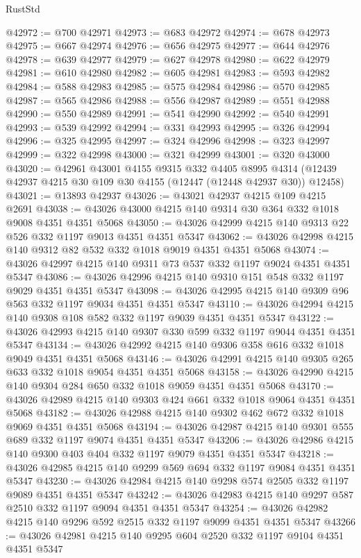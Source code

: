 \begin{lexlean}{RustStd}
\begin{coremodule}
@42972 := @700 @42971
@42973 := @683 @42972
@42974 := @678 @42973
@42975 := @667 @42974
@42976 := @656 @42975
@42977 := @644 @42976
@42978 := @639 @42977
@42979 := @627 @42978
@42980 := @622 @42979
@42981 := @610 @42980
@42982 := @605 @42981
@42983 := @593 @42982
@42984 := @588 @42983
@42985 := @575 @42984
@42986 := @570 @42985
@42987 := @565 @42986
@42988 := @556 @42987
@42989 := @551 @42988
@42990 := @550 @42989
@42991 := @541 @42990
@42992 := @540 @42991
@42993 := @539 @42992
@42994 := @331 @42993
@42995 := @326 @42994
@42996 := @325 @42995
@42997 := @324 @42996
@42998 := @323 @42997
@42999 := @322 @42998
@43000 := @321 @42999
@43001 := @320 @43000
@43020 := @42961
    @43001
    @4155
    @9315
    @332
    @4405
    @8995
    @4314
    (@12439 @42937 @4215 @30 @109 @30 @4155 (@12447 (@12448 @42937 @30)) @12458)
@43021 := @13893 @42937
@43026 := @43021 @42937 @4215 @109 @4215 @2691
@43038 := @43026 @43000 @4215 @140 @9314 @30 @364 @332 @1018 @9008 @4351 @4351 @5068
@43050 := @43026 @42999 @4215 @140 @9313 @22 @526 @332 @1197 @9013 @4351 @4351 @5347
@43062 := @43026 @42998 @4215 @140 @9312 @82 @532 @332 @1018 @9019 @4351 @4351 @5068
@43074 := @43026 @42997 @4215 @140 @9311 @73 @537 @332 @1197 @9024 @4351 @4351 @5347
@43086 := @43026 @42996 @4215 @140 @9310 @151 @548 @332 @1197 @9029 @4351 @4351 @5347
@43098 := @43026 @42995 @4215 @140 @9309 @96 @563 @332 @1197 @9034 @4351 @4351 @5347
@43110 := @43026 @42994 @4215 @140 @9308 @108 @582 @332 @1197 @9039 @4351 @4351 @5347
@43122 := @43026 @42993 @4215 @140 @9307 @330 @599 @332 @1197 @9044 @4351 @4351 @5347
@43134 := @43026 @42992 @4215 @140 @9306 @358 @616 @332 @1018 @9049 @4351 @4351 @5068
@43146 := @43026 @42991 @4215 @140 @9305 @265 @633 @332 @1018 @9054 @4351 @4351 @5068
@43158 := @43026 @42990 @4215 @140 @9304 @284 @650 @332 @1018 @9059 @4351 @4351 @5068
@43170 := @43026 @42989 @4215 @140 @9303 @424 @661 @332 @1018 @9064 @4351 @4351 @5068
@43182 := @43026 @42988 @4215 @140 @9302 @462 @672 @332 @1018 @9069 @4351 @4351 @5068
@43194 := @43026 @42987 @4215 @140 @9301 @555 @689 @332 @1197 @9074 @4351 @4351 @5347
@43206 := @43026 @42986 @4215 @140 @9300 @403 @404 @332 @1197 @9079 @4351 @4351 @5347
@43218 := @43026 @42985 @4215 @140 @9299 @569 @694 @332 @1197 @9084 @4351 @4351 @5347
@43230 := @43026 @42984 @4215 @140 @9298 @574 @2505 @332 @1197 @9089 @4351 @4351 @5347
@43242 := @43026 @42983 @4215 @140 @9297 @587 @2510 @332 @1197 @9094 @4351 @4351 @5347
@43254 := @43026 @42982 @4215 @140 @9296 @592 @2515 @332 @1197 @9099 @4351 @4351 @5347
@43266 := @43026 @42981 @4215 @140 @9295 @604 @2520 @332 @1197 @9104 @4351 @4351 @5347

\end{coremodule}
\end{lexlean}
